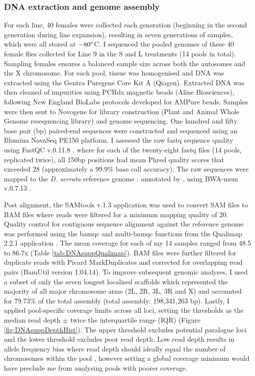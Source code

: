 \subsubsection{DNA extraction and genome assembly}
For each line, 40 females were collected each generation (beginning in the second generation during line expansion), resulting in seven generations of samples, which were all stored at $-80\degree$C. I sequenced the pooled genomes of these 40 female flies collected for Line 9 in the S and L treatments (14 pools in total). Sampling females ensures a balanced sample size across both the autosomes and the X chromosome. For each pool, tissue was homogenised and DNA was extracted using the Gentra Puregene Core Kit A (Qiagen). Extracted DNA was then cleaned of impurities using PCRdx magnetic beads (Aline Biosciences), following New England BioLabs protocols developed for AMPure beads. Samples were then sent to Novogene for library construction (Plant and Animal Whole Genome resequencing library) and genome sequencing. One hundred and fifty base pair (bp) paired-end sequences were constructed and sequenced using an Illumina NovaSeq PE150 platform. I assessed the raw fastq sequence quality using FastQC v.0.11.8 \citep{Andr12}, where for each of the twenty-eight fastq files (14 pools, replicated twice), all 150bp positions had mean Phred quality scores that exceeded 28 (approximately a 99.9\% base call accuracy). The raw sequences were mapped to the \textit{D. serrata} reference genome \citep{Alle17B}, annotated by \citet{Redd18}, using BWA-mem v.0.7.13 \citep{Li09bwa}.\par 

Post alignment, the SAMtools v.1.3 \citep{Li09samtools} application was used to convert SAM files to BAM files where reads were filtered for a minimum mapping quality of 20. Quality control for contiguous sequence alignment against the reference genome was performed using the bamqc and multi-bamqc functions from the Qualimap 2.2.1 application \citep{Garc12Qualimap, Okon16}. The mean coverage for each of my 14 samples ranged from 48.5 to 86.7x (Table \ref{tab:DNAsuppQualimap}). BAM files were further filtered for duplicate reads with Picard MarkDuplicates and corrected for overlapping read pairs (BamUtil version 1.04.14). To improve subsequent genomic analyses, I used a subset of only the seven longest localised scaffolds which represented the majority of all major chromosome arms (2L, 2R, 3L, 3R and X) and accounted for 79.73\% of the total assembly (total assembly: 198,341,263 bp). Lastly, I applied pool-specific coverage limits across all loci, setting the thresholds as the median read depth $\pm$ twice the interquartile range (IQR) (Figure \ref{fig:DNAsuppDepthHist}). The upper threshold excludes potential paralogue loci and the lower threshold excludes poor read depth. Low read depth results in allele frequency bias where read depth should ideally equal the number of chromosomes within the pool 
\citep[here $\sim80$,][]{Futs10,Kola11,Lync14}, however setting a global coverage minimum would have preclude me from analysing pools with poorer coverage.\par

